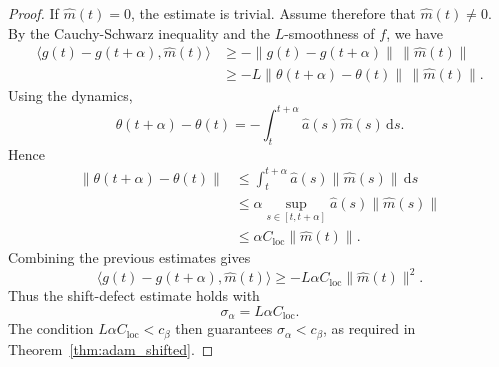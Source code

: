 \documentclass{article} %
\begin{document}
\begin{proof}
If \(\widehat m(t)=0\), the estimate is trivial. Assume therefore that \(\widehat m(t)\neq0\). By the Cauchy-Schwarz inequality and the \(L\)-smoothness of \(f\), we have
\[
\begin{aligned}
    \bigl\langle g(t)-g(t+\alpha),\widehat m(t)\bigr\rangle
    &\geq
    -\|g(t)-g(t+\alpha)\|\,\|\widehat m(t)\| \\
    &\geq
    -L\|\theta(t+\alpha)-\theta(t)\|\,\|\widehat m(t)\|.
\end{aligned}
\]
Using the dynamics,
\[
    \theta(t+\alpha)-\theta(t)
    =
    -\int_t^{t+\alpha}
    \widehat a(s)\widehat m(s)\,\mathrm ds .
\]
Hence
\[
\begin{aligned}
    \|\theta(t+\alpha)-\theta(t)\|
    &\leq
    \int_t^{t+\alpha}
    \widehat a(s)\|\widehat m(s)\|\,\mathrm ds \\
    &\leq
    \alpha
    \sup_{s\in[t,t+\alpha]}
    \widehat a(s)\|\widehat m(s)\| \\
    &\leq
    \alpha C_{\mathrm{loc}}\|\widehat m(t)\|.
\end{aligned}
\]
Combining the previous estimates gives
\[
    \bigl\langle g(t)-g(t+\alpha),\widehat m(t)\bigr\rangle
    \geq
    -L\alpha C_{\mathrm{loc}}\|\widehat m(t)\|^2.
\]
Thus the shift-defect estimate holds with
\[
    \sigma_\alpha=L\alpha C_{\mathrm{loc}}.
\]
The condition \(L\alpha C_{\mathrm{loc}}<c_\beta\) then guarantees \(\sigma_\alpha<c_\beta\), as required in Theorem~\ref{thm:adam_shifted}.
\end{proof}
\end{document}
